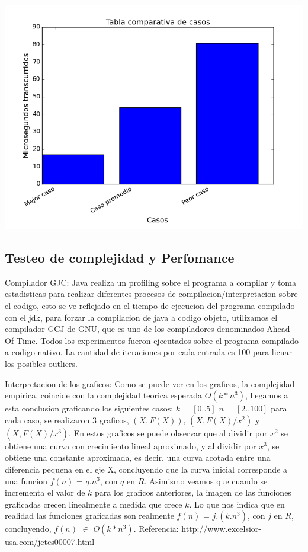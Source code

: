 \begin{center}
\includegraphics[scale=0.5]{images/casosej3}
\end{center}

\subsection{Testeo de complejidad y Perfomance}
Compilador GJC: Java realiza un profiling sobre el programa a compilar y toma estadisticas para realizar diferentes procesos de compilacion/interpretacion sobre el codigo, esto se ve reflejado en el tiempo de ejecucion del programa compilado con el jdk, para forzar la compilacion de java a codigo objeto, utilizamos el compilador GCJ de GNU, que es uno de los compiladores denominados Ahead-Of-Time. Todos los experimentos fueron ejecutados sobre el programa compilado a codigo nativo. La cantidad de iteraciones por cada entrada es 100 para licuar los posibles outliers.

\vspace{2mm}

Interpretacion de los graficos: Como se puede ver en los graficos, la complejidad empirica, coincide con la complejidad teorica esperada $O(k*n^3)$, llegamos a esta conclusion graficando los siguientes casos: $k$ = $[0..5]$ $n$ = $[2..100]$ para cada caso, se realizaron 3 graficos, $(X,F(X))$,  $(X,F(X)/x^2)$ y $(X,F(X)/x^3)$. En estos graficos se puede observar que al dividir por $x^2$ se obtiene una curva con crecimiento lineal aproximado, y al dividir por $x^3$, se obtiene una constante aproximada, es decir, una curva acotada entre una diferencia pequena en el eje X, concluyendo que la curva inicial corresponde a una funcion $f(n)$ = $q.n^3$, con $q$ en $R$. Asimismo veamos que cuando se incrementa el valor de $k$ para los graficos anteriores, la imagen de las funciones graficadas crecen linealmente a medida que crece $k$. Lo que nos indica que en realidad las funciones graficadas son realmente $f(n)$ = $j.(k.n^3)$, con $j$ en $R$, concluyendo, $f(n)$ $\in$ $O(k*n^3)$. Referencia: http://www.excelsior-usa.com/jetcs00007.html

